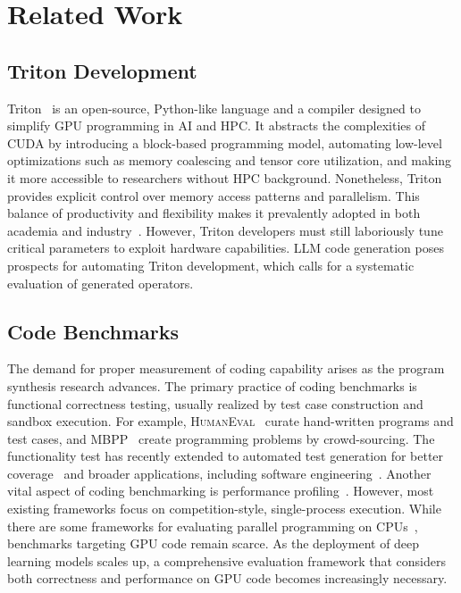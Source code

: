 \section{Related Work}

\subsection{Triton Development}
Triton~\cite{triton-2021-translation} is an open-source, Python-like language and a compiler designed to simplify GPU programming in AI and HPC. 
It abstracts the complexities of CUDA by introducing a block-based programming model, automating low-level optimizations such as memory coalescing and tensor core utilization, and making it more accessible to researchers without HPC background. 
Nonetheless, Triton provides explicit control over memory access patterns and parallelism. 
This balance of productivity and flexibility makes it prevalently adopted in both academia and industry~\cite{vllm, lightllm, liger, unsloth}. 
However, Triton developers must still laboriously tune critical parameters to exploit hardware capabilities. 
LLM code generation poses prospects for automating Triton development, which calls for a systematic evaluation of generated operators. 


\subsection{Code Benchmarks}
The demand for proper measurement of coding capability arises as the program synthesis research advances. 
The primary practice of coding benchmarks is functional correctness testing, usually realized by test case construction and sandbox execution. 
For example, \textsc{HumanEval}~\cite{humeval-2021-human} curate hand-written programs and test cases, and MBPP~\cite{mbpp2021} create programming problems by crowd-sourcing. 
The functionality test has recently extended to automated test generation for better coverage~\cite{evalplus} and broader applications, including software engineering~\cite{jimenez2024swebench}.
Another vital aspect of coding benchmarking is performance profiling~\cite{shypulalearning,evalplus,huang2024effibench,qiu2024efficient}.
However, most existing frameworks focus on competition-style, single-process execution. 
While there are some frameworks for evaluating parallel programming on CPUs~\cite{nichols2024can,chaturvedi2024hpc}, benchmarks targeting GPU code remain scarce. 
As the deployment of deep learning models scales up, a comprehensive evaluation framework that considers both correctness and performance on GPU code becomes increasingly necessary. 


